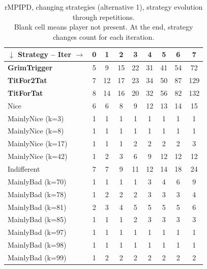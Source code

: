 \documentclass[journal,10pt,twoside]{IEEEtran}
\begin{document}
\begin{table}[ht]
    \caption{rMPIPD, changing strategies (alternative 1), strategy evolution through repetitions.\\
    Blank cell means player not present. At the end, strategy changes count for each iteration.}
    \label{tab:cripdmp}
    \centering
    \begin{minipage}{.55\textwidth}
    \begin{tabular}{l|cccccccc} \toprule
        $\downarrow$ Strategy -- Iter $\rightarrow$ & 0 & 1 & 2 & 3 & 4 & 5 & 6 & 7 \\ \midrule
        \textbf{GrimTrigger} &   5 &   9 &   15 &   22 &   31 &   41 &   54 &   72 \\
        \textbf{TitFor2Tat}  &   7 &  12 &   17 &   23 &   34 &   50 &   87 &  129 \\
        \textbf{TitForTat}   &   8 &  14 &   16 &   20 &   32 &   56 &   82 &  132 \\
        Nice                 &   6 &   6 &    8 &    9 &   12 &   13 &   14 &   15 \\
        MainlyNice (k=3)     &   1 &   1 &    1 &    1 &    1 &    1 &    1 &    1 \\
        MainlyNice (k=8)     &   1 &   1 &    1 &    1 &    1 &    1 &    1 &    1 \\
        MainlyNice (k=17)    &   1 &   1 &    1 &    2 &    2 &    2 &    2 &    3 \\
        MainlyNice (k=42)    &   1 &   2 &    3 &    6 &    9 &   12 &   12 &   12 \\
        Indifferent          &   7 &   7 &    9 &   11 &   12 &   14 &   18 &   24 \\
        MainlyBad (k=70)     &   1 &   1 &    1 &    1 &    3 &    4 &    6 &    9 \\
        MainlyBad (k=78)     &   1 &   2 &    2 &    2 &    3 &    3 &    3 &    4 \\
        MainlyBad (k=81)     &   2 &   3 &    4 &    5 &    5 &    5 &    5 &    6 \\
        MainlyBad (k=85)     &   1 &   1 &    1 &    2 &    3 &    3 &    3 &    3 \\
        MainlyBad (k=97)     &   1 &   1 &    1 &    1 &    1 &    1 &    1 &    1 \\
        MainlyBad (k=98)     &   1 &   1 &    1 &    1 &    1 &    1 &    1 &    1 \\
        MainlyBad (k=99)     &   1 &   2 &    2 &    2 &    2 &    2 &    2 &    2 \\

\end{tabular}
\end{minipage}
\end{table}
\end{document}
